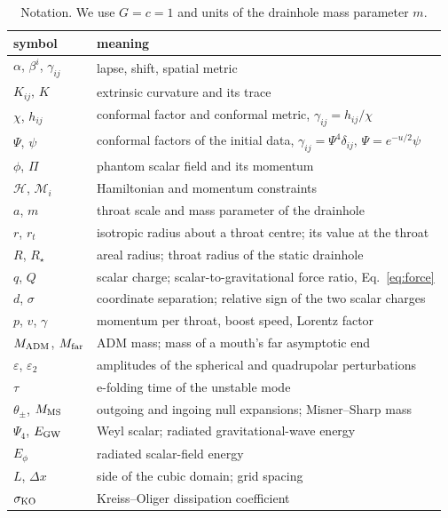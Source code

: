 \documentclass[twocolumn,floatfix,aps,prd,superscriptaddress,nofootinbib]{revtex4-2}
\begin{document}
\begin{table}[t]
\caption{Notation. We use $G=c=1$ and units of the drainhole mass parameter $m$.}
\label{tab:notation}
\scriptsize
\begin{ruledtabular}
\begin{tabular}{lp{}}
symbol & meaning \\
\hline
$\alpha$, $\beta^i$, $\gamma_{ij}$ & lapse, shift, spatial metric \\
$K_{ij}$, $K$ & extrinsic curvature and its trace \\
$\chi$, $h_{ij}$ & conformal factor and conformal metric, $\gamma_{ij}=h_{ij}/\chi$ \\
$\Psi$, $\psi$ & conformal factors of the initial data, $\gamma_{ij}=\Psi^4\delta_{ij}$, $\Psi=e^{-u/2}\psi$ \\
$\phi$, $\Pi$ & phantom scalar field and its momentum \\
$\mathcal H$, $\mathcal M_i$ & Hamiltonian and momentum constraints \\
$a$, $m$ & throat scale and mass parameter of the drainhole \\
$r$, $r_t$ & isotropic radius about a throat centre; its value at the throat \\
$R$, $R_\star$ & areal radius; throat radius of the static drainhole \\
$q$, $Q$ & scalar charge; scalar-to-gravitational force ratio, Eq.~\eqref{eq:force} \\
$d$, $\sigma$ & coordinate separation; relative sign of the two scalar charges \\
$p$, $v$, $\gamma$ & momentum per throat, boost speed, Lorentz factor \\
$M_{\rm ADM}$, $M_{\rm far}$ & ADM mass; mass of a mouth's far asymptotic end \\
$\varepsilon$, $\varepsilon_2$ & amplitudes of the spherical and quadrupolar perturbations \\
$\tau$ & e-folding time of the unstable mode \\
$\theta_\pm$, $M_{\rm MS}$ & outgoing and ingoing null expansions; Misner--Sharp mass \\
$\Psi_4$, $E_{\rm GW}$ & Weyl scalar; radiated gravitational-wave energy \\
$E_\phi$ & radiated scalar-field energy \\
$L$, $\Delta x$ & side of the cubic domain; grid spacing \\
$\sigma_{\rm KO}$ & Kreiss--Oliger dissipation coefficient \\
\end{tabular}
\end{ruledtabular}
\end{table}
\end{document}
